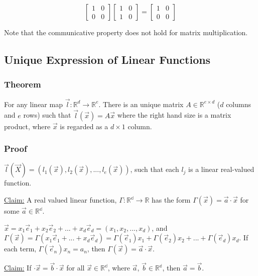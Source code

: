 \documentclass[11 pt, twoside]{article}
\begin{document}
\[
    \left[\begin{array}{cc}
        1 & 0 \\
        0 & 0
    \end{array}\right]
    \left[\begin{array}{cc}
        1 & 0 \\
        1 & 0
    \end{array}\right]
    =
    \left[\begin{array}{cc}
        1 & 0 \\
        0 & 0
    \end{array}\right]
\]

Note that the communicative property does not hold for matrix multiplication.

\subsection{Unique Expression of Linear Functions}
\subsubsection{Theorem}
For any linear map $\vec{l}: \mathbb{R}^d \to \mathbb{R}^e$.
There is an unique matrix $A \in \mathbb{R}^{e \times d}$ ($d$ columns and
$e$ rows) such that $\vec{l}(\vec{x}) = A\vec{x}$ where the right hand size is a
matrix product, where $\vec{x}$ is regarded as a $d \times 1$ column.

\subsubsection{Proof}
$\vec{l}(\vec{X}) = (l_1(\vec{x}), l_2(\vec{x}),...,l_e(\vec{x}))$, such that each $l_j$ is a linear real-valued function. 

\underline{Claim:} A real valued linear function, $\Gamma: \mathbb{R^d} \to \mathbb{R}$ has the form $\Gamma(\vec{x}) = \vec{a} \cdot \vec{x}$ for some $\vec{a} \in \mathbb{R^d}$.

$\vec{x} = x_1\vec{e}_1 + x_2\vec{e}_2 + ... + x_d\vec{e}_d = (x_1, x_2, ..., x_d)$, and $\Gamma(\vec{x}) = \Gamma(x_1\vec{e}_1 + ... + x_d\vec{e}_d) = \Gamma(\vec{e}_1)x_1 + \Gamma(\vec{e}_2)x_2 + ... + \Gamma(\vec{e}_d)x_d$. If each term, $\Gamma(\vec{e}_n)x_n = a_n$, then $\Gamma(\vec{x}) = \vec{a} \cdot \vec{x}$.

\underline{Claim:} If  $\cdot \vec{x}  = \vec{b} \cdot \vec{x}$ for all $\vec{x} \in \mathbb{R^d}$, where $\vec{a}$, $\vec{b} \in \mathbb{R^d}$, then $\vec{a} = \vec{b}$.
\end{document}
